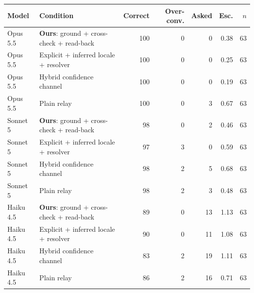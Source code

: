 \begin{tabular}{llrrrrr}
\toprule
Model & Condition & Correct & Over-conv. & Asked & Esc. & $n$ \\
\midrule
Opus 5.5 & \textbf{Ours}: ground + cross-check + read-back & 100 & 0 & 0 & 0.38 & 63 \\
Opus 5.5 & Explicit + inferred locale + resolver & 100 & 0 & 0 & 0.25 & 63 \\
Opus 5.5 & Hybrid confidence channel & 100 & 0 & 0 & 0.19 & 63 \\
Opus 5.5 & Plain relay & 100 & 0 & 3 & 0.67 & 63 \\
Sonnet 5 & \textbf{Ours}: ground + cross-check + read-back & 98 & 0 & 2 & 0.46 & 63 \\
Sonnet 5 & Explicit + inferred locale + resolver & 97 & 3 & 0 & 0.59 & 63 \\
Sonnet 5 & Hybrid confidence channel & 98 & 2 & 5 & 0.68 & 63 \\
Sonnet 5 & Plain relay & 98 & 2 & 3 & 0.48 & 63 \\
Haiku 4.5 & \textbf{Ours}: ground + cross-check + read-back & 89 & 0 & 13 & 1.13 & 63 \\
Haiku 4.5 & Explicit + inferred locale + resolver & 90 & 0 & 11 & 1.08 & 63 \\
Haiku 4.5 & Hybrid confidence channel & 83 & 2 & 19 & 1.11 & 63 \\
Haiku 4.5 & Plain relay & 86 & 2 & 16 & 0.71 & 63 \\
\bottomrule
\end{tabular}
